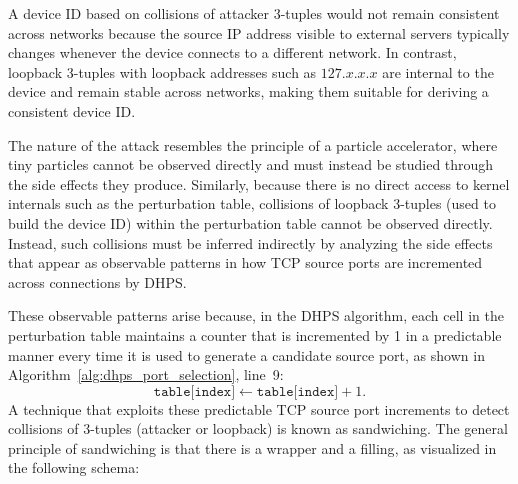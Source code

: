 \documentclass{report}
\begin{document}
A device ID based on collisions of \alert{attacker 3-tuples} would not remain consistent across networks because the source IP address visible to external servers typically changes whenever the device connects to a different network. In contrast, \alert{loopback 3-tuples} with loopback addresses such as $127.x.x.x$ are internal to the device and remain stable across networks, making them suitable for deriving a consistent device ID.

The nature of the attack resembles the principle of a \alert{particle accelerator}, where tiny particles cannot be observed directly and must instead be studied through the side effects they produce. Similarly, because there is no direct access to kernel internals such as the perturbation table, collisions of loopback 3-tuples (used to build the device ID) within the perturbation table \alert{cannot be observed directly}. Instead, such collisions must be inferred indirectly by analyzing the side effects that appear as observable patterns in how TCP source ports are incremented across connections by DHPS.

These observable patterns arise because, in the DHPS algorithm, each cell in the perturbation table maintains a counter that is incremented by 1 in a predictable manner every time it is used to generate a candidate source port, as shown in Algorithm~\ref{alg:dhps_port_selection}, line~9:
\[
	\texttt{table[index]} \leftarrow \texttt{table[index]} + 1.
\]
A technique that exploits these predictable TCP source port increments to detect collisions of 3-tuples (attacker or loopback) is known as \alert{sandwiching}. The general principle of sandwiching is that there is a \alert{wrapper} and a \alert{filling}, as visualized in the following schema:
\end{document}
